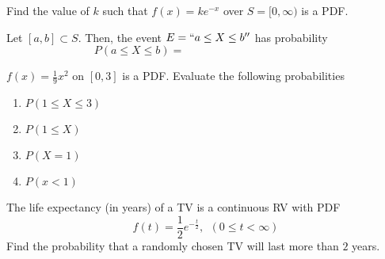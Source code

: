 \documentclass[12pt, a4paper]{article}
\begin{document}
\vspace{-2in}
\begin{ex}
  Find the value of \(k\) such that \(f(x) = k e^{-x}\) over \(S =
  [0,\infty)\) is a PDF.
\end{ex}
\begin{defi}
  Let \([a,b] \subset S\). Then, the event \(E = ``a \leq X \leq b''\)
  has probability \[
    P(a \leq X \leq b) = \hspace{2in}
  \]
\end{defi}
\begin{ex}
  \(f(x) = \frac{1}{9} x^2\) on \([0,3]\) is a PDF. Evaluate the
  following probabilities
  \begin{enumerate}
  \item \(P(1 \leq X \leq 3)\)
  \item \(P(1 \leq X)\)
  \item \(P(X=1)\)
  \item \(P(x < 1)\)
  \end{enumerate}
\end{ex}
\vspace{-2in}
\begin{ex}
  The life expectancy (in years) of a TV is a continuous RV with
  PDF \[
    f(t) = \frac{1}{2}e^{-\frac{t}{2}}, \ \ (0 \leq t < \infty)
  \]
  Find the probability that a randomly chosen TV will last more than
  \(2\) years.
\end{ex}
\end{document}
